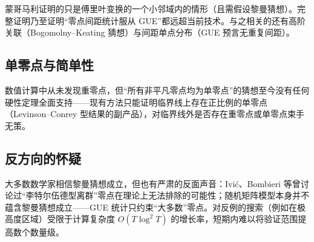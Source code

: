 蒙哥马利证明的只是傅里叶变换的一个小邻域内的情形（且需假设黎曼猜想）。完整证明乃至证明“零点间距统计服从 GUE”都远超当前技术。与之相关的还有高阶关联（Bogomolny--Keating 猜想）与间距单点分布（GUE 预言无重复间距）。

\subsection{单零点与简单性}

数值计算中从未发现重零点，但“所有非平凡零点均为单零点”的猜想至今没有任何硬性定理全面支持——现有方法只能证明临界线上存在正比例的单零点（Levinson--Conrey 型结果的副产品），对临界线外是否存在重零点或单零点束手无策。

\subsection{反方向的怀疑}

大多数数学家相信黎曼猜想成立，但也有严肃的反面声音：Ivić、Bombieri 等曾讨论过“李特尔伍德型离群”零点在理论上无法排除的可能性；随机矩阵模型本身并不蕴含黎曼猜想成立——GUE 统计只约束“大多数”零点。对反例的搜索（例如在极高度区域）受限于计算复杂度 $O(T \log^2 T)$ 的增长率，短期内难以将验证范围提高数个数量级。
